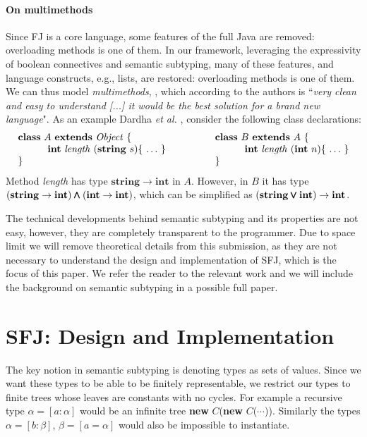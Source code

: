 \documentclass[runningheads]{llncs}
\begin{document}
\paragraph{On multimethods}
Since FJ is a core language, some features of the full Java are removed: overloading methods is one of them.
In our framework, leveraging the expressivity of boolean connectives and semantic subtyping, many of these features, and language constructs, e.g., lists, are restored: overloading methods is one of them. We can thus model \emph{multimethods}, \cite{BC97}, which according to the authors is ``\emph{very clean and easy to understand [...] it would be the best solution for a brand new language}".
As an example Dardha \emph{et al.}  \cite{Dardha2013,Dardha2017}, consider the following class declarations:
$$
\begin{array}{ll}
\mathbf{class} \  A \ \mathbf{extends }\  \mathit{Object}\ \{
&
\qquad
\mathbf{class} \  B \ \mathbf{extends }\  A\ \{
\\
	\qquad\quad \mathbf{int}\ \mathit{length}\ (\mathbf{string}\ s)\{\ \ldots\ \}\qquad
&
	\qquad\qquad\quad \mathbf{int}\ \mathit{length}\ (\mathbf{int}\ n)\{\ \ldots\ \}
\\
\}
&
\qquad \}
\end{array}
$$
Method {\it length} has type $\mathbf{string} \rightarrow \mathbf{int}$ in $A$. However, in $B$ it has type $(\mathbf{string} \rightarrow \mathbf{int}) \pmb{\wedge} (\mathbf{int} \rightarrow \mathbf{int})$,
which can be simplified as $(\mathbf{string} \pmb{\vee} \mathbf{int}) \rightarrow \mathbf{int}$.

The technical developments behind semantic subtyping and its properties are not easy, however, they are completely transparent to the programmer.
Due to space limit we will remove theoretical details from this submission, as they are not necessary to understand the design and implementation of SFJ, which is the focus of this paper. We refer the reader to the relevant work \cite{Dardha2013,Dardha2017} and we will include the background on semantic subtyping in a possible full paper.


\section{SFJ: Design and Implementation}
\label{sec:design}
The key notion in semantic subtyping is denoting types as sets of values. Since we want these types
to be able to be finitely representable, we restrict our types to finite trees whose
leaves are constants with no cycles. For example a recursive type $\alpha = [a : \alpha]$ would
be an infinite tree \textbf{new} $C$(\textbf{new} $C$($\cdots{}$)). Similarly the types $\alpha =
[b: \beta]$, $\beta = [a = \alpha]$ would also be impossible to instantiate.
\end{document}
